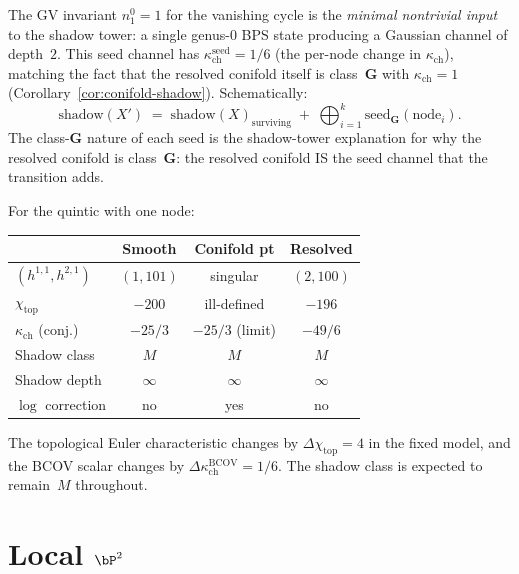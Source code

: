\begin{remark}[The seed mechanism: \texorpdfstring{$n^0_1 = 1$}{n-0-1 = 1}]
\label{rem:conifold-seed}
The GV invariant $n^0_1 = 1$ for the vanishing cycle is the \emph{minimal nontrivial input} to the shadow tower: a single genus-$0$ BPS state producing a Gaussian channel of depth~$2$. This seed channel has $\kappa_{\mathrm{ch}}^{\mathrm{seed}} = 1/6$ (the per-node change in $\kappa_{\mathrm{ch}}$), matching the fact that the resolved conifold itself is class~$\mathbf{G}$ with $\kappa_{\mathrm{ch}} = 1$ (Corollary~\ref{cor:conifold-shadow}). Schematically:
\[
 \text{shadow}(X') \;=\; \text{shadow}(X)_{\text{surviving}} \;+\; \bigoplus_{i=1}^{k} \text{seed}_{\mathbf{G}}(\text{node}_i).
\]
The class-$\mathbf{G}$ nature of each seed is the shadow-tower explanation for why the resolved conifold is class~$\mathbf{G}$: the resolved conifold IS the seed channel that the transition adds.
\end{remark}

\begin{computation}
\label{comp:conifold-shadow-quintic}
For the quintic with one node:
\begin{center}
\renewcommand{\arraystretch}{1.15}
\begin{tabular}{lccc}
\toprule
 & \textbf{Smooth} & \textbf{Conifold pt} & \textbf{Resolved} \\
\midrule
$(h^{1,1}, h^{2,1})$ & $(1, 101)$ & singular & $(2, 100)$ \\
$\chi_{\mathrm{top}}$ & $-200$ & ill-defined & $-196$ \\
$\kappa_{\mathrm{ch}}$ (conj.) & $-25/3$ & $-25/3$ (limit) & $-49/6$ \\
Shadow class & $M$ & $M$ & $M$ \\
Shadow depth & $\infty$ & $\infty$ & $\infty$ \\
$\log$ correction & no & yes & no \\
\bottomrule
\end{tabular}
\end{center}
The topological Euler characteristic changes by \(\Delta\chi_{\mathrm{top}} = 4\) in the fixed model, and the BCOV scalar changes by \(\Delta\kappa_{\mathrm{ch}}^{\mathrm{BCOV}} = 1/6\). The shadow class is expected to remain~$M$ throughout.
\end{computation}


\section{Local \texorpdfstring{$\bP^2$}{P-2}}
\label{sec:local-p2}

